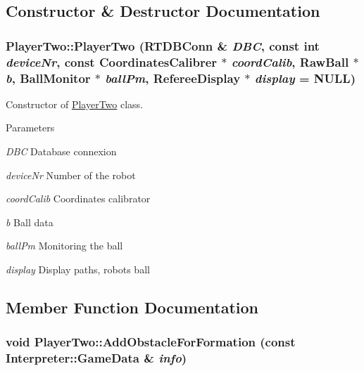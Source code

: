 \subsection{Constructor \& Destructor Documentation}
\hypertarget{classPlayerTwo_ac69719e70c78f7dffa36300f833955b1}{
\subsubsection[{PlayerTwo}]{\setlength{\rightskip}{0pt plus 5cm}PlayerTwo::PlayerTwo (RTDBConn \& {\em DBC}, \/  const int {\em deviceNr}, \/  const {\bf CoordinatesCalibrer} $\ast$ {\em coordCalib}, \/  RawBall $\ast$ {\em b}, \/  {\bf BallMonitor} $\ast$ {\em ballPm}, \/  {\bf RefereeDisplay} $\ast$ {\em display} = {\ttfamily NULL})}}
\label{classPlayerTwo_ac69719e70c78f7dffa36300f833955b1}


Constructor of \hyperlink{classPlayerTwo}{PlayerTwo} class. 


\begin{DoxyParams}{Parameters}
\item[{\em DBC}]Database connexion \item[{\em deviceNr}]Number of the robot \item[{\em coordCalib}]Coordinates calibrator \item[{\em b}]Ball data \item[{\em ballPm}]Monitoring the ball \item[{\em display}]Display paths, robots ball \end{DoxyParams}


\subsection{Member Function Documentation}
\hypertarget{classPlayerTwo_a9e3341541658f54a2dfb0491a774b4d4}{
\subsubsection[{AddObstacleForFormation}]{\setlength{\rightskip}{0pt plus 5cm}void PlayerTwo::AddObstacleForFormation (const {\bf Interpreter::GameData} \& {\em info})}}
\label{classPlayerTwo_a9e3341541658f54a2dfb0491a774b4d4}


